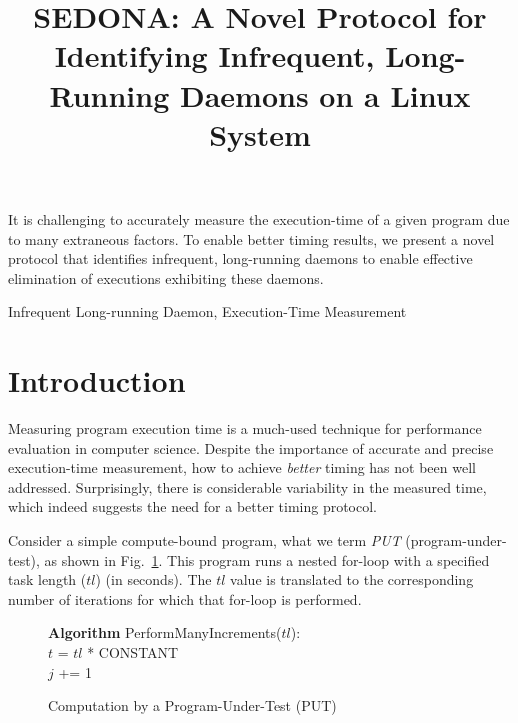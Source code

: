 \documentclass[letter]{ieice}
\title{SEDONA: A Novel Protocol for Identifying Infrequent, Long-Running Daemons on a Linux System}
\begin{document}
\maketitle

\begin{summary}
It is challenging to accurately measure the execution-time of a given
program due to many extraneous factors. To enable better timing results,
we present a novel protocol that identifies infrequent, 
long-running daemons to enable effective elimination of executions 
exhibiting these daemons.

\end{summary}
\begin{keywords}
Infrequent Long-running Daemon, Execution-Time Measurement
\end{keywords}

\section{Introduction}
\label{sec:intro}

Measuring program execution time is a much-used
technique for performance evaluation in computer science. 
Despite the importance of accurate and precise execution-time measurement, 
how to achieve {\em better} timing has not been well addressed. 
Surprisingly, there is considerable variability in the measured time, 
which indeed suggests the need for a better timing protocol.

Consider a simple compute-bound program, what we term {\em PUT} (program-under-test), 
as shown in Fig.~\ref{alg:put}. 
This program runs a nested for-loop with a specified task length ($tl$) (in seconds). 
The $tl$ value is translated to the corresponding 
number of iterations for which that for-loop is performed. 

\vspace{-.2in}
\begin{figure}[h]
\begin{center}
\begin{algorithmic}
{\bf Algorithm} PerformManyIncrements($tl$): \\
\STATE $t$ = $tl$ * {CONSTANT} \\
		\STATE $j$ += 1 \\
	\ENDFOR 
\ENDFOR 
\end{algorithmic}
\end{center}
\caption{Computation by a Program-Under-Test (PUT)\label{alg:put}}
\vspace{-.2in}
\end{figure}
\end{document}
